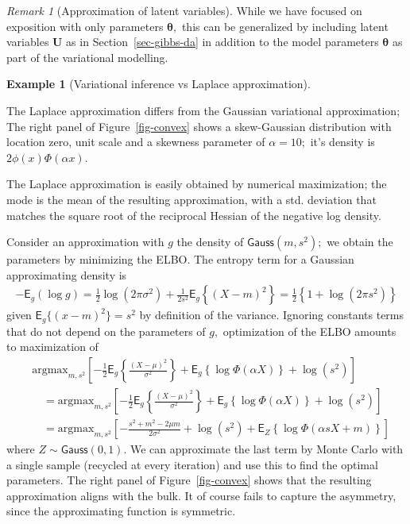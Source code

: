 \documentclass[
  11pt,
  letterpaper,
]{scrbook}
\theoremstyle{definition}
\theoremstyle{definition}
\newtheorem{example}{Example}[chapter]
\theoremstyle{definition}
\theoremstyle{plain}
\theoremstyle{plain}
\theoremstyle{plain}
\theoremstyle{remark}
\newtheorem{refremark}{Remark}[chapter]
\begin{document}
\begin{refremark}[Approximation of latent variables]
While we have focused on exposition with only parameters
\(\boldsymbol{\theta},\) this can be generalized by including latent
variables \(\boldsymbol{U}\) as in Section~\ref{sec-gibbs-da} in
addition to the model parameters \(\boldsymbol{\theta}\) as part of the
variational modelling.

\label{rem-approximation-latent}

\end{refremark}

\begin{example}[Variational inference vs Laplace
approximation]\protect\hypertarget{exm-varional-vs-laplace}{}\label{exm-varional-vs-laplace}

The Laplace approximation differs from the Gaussian variational
approximation; The right panel of Figure~\ref{fig-convex} shows a
skew-Gaussian distribution with location zero, unit scale and a skewness
parameter of \(\alpha=10;\) it's density is \(2\phi(x)\Phi(\alpha x).\)

The Laplace approximation is easily obtained by numerical maximization;
the mode is the mean of the resulting approximation, with a std.
deviation that matches the square root of the reciprocal Hessian of the
negative log density.

Consider an approximation with \(g\) the density of
\(\mathsf{Gauss}(m, s^2);\) we obtain the parameters by minimizing the
ELBO. The entropy term for a Gaussian approximating density is
\begin{align*}
-\mathsf{E}_g(\log g) = \frac{1}{2}\log(2\pi \sigma^2) + \frac{1}{2s^2}\mathsf{E}_g\left\{(X-m)^2 \right\} = \frac{1}{2} \left\{1+\log(2\pi s^2)\right\}
\end{align*} given \(\mathsf{E}_g\{(x-m)^2\}=s^2\) by definition of the
variance. Ignoring constants terms that do not depend on the parameters
of \(g,\) optimization of the ELBO amounts to maximization of
\begin{align*}
&\mathrm{argmax}_{m, s^2} \left[-\frac{1}{2} \mathsf{E}_g \left\{ \frac{(X-\mu)^2}{\sigma^2}\right\} + \mathsf{E}_g\left\{\log \Phi(\alpha X)\right\} + \log(s^2) \right] \\
&\quad =\mathrm{argmax}_{m, s^2} \left[ -\frac{1}{2} \mathsf{E}_g \left\{ \frac{(X-\mu)^2}{\sigma^2}\right\} + \mathsf{E}_g\left\{\log \Phi(\alpha X)\right\} + \log(s^2) \right]
\\&\quad =\mathrm{argmax}_{m, s^2} \left[ -\frac{s^2 + m^2 -2\mu m}{2\sigma^2} + \log(s^2) + \mathsf{E}_{Z}\left\{\log \Phi(\alpha sX+m)\right\} \right]
\end{align*} where \(Z \sim \mathsf{Gauss}(0,1).\) We can approximate
the last term by Monte Carlo with a single sample (recycled at every
iteration) and use this to find the optimal parameters. The right panel
of Figure~\ref{fig-convex} shows that the resulting approximation aligns
with the bulk. It of course fails to capture the asymmetry, since the
approximating function is symmetric.

\end{example}
\end{document}
